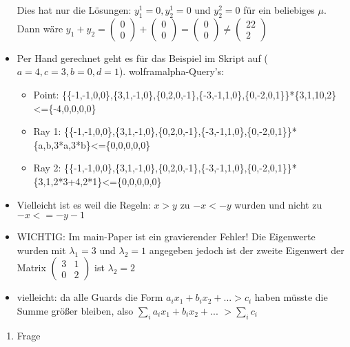 \begin{itemize}
		Dies hat nur die Lösungen: $y_1^1=0, y_2^1=0$ und $y_2^2=0$ für ein beliebiges $\mu$.\newline
		Dann wäre $y_1+y_2= \begin{pmatrix} 0 \\ 0 \end{pmatrix} + \begin{pmatrix} 0 \\ 0 \end{pmatrix}= \begin{pmatrix} 0 \\ 0 \end{pmatrix} \ne \begin{pmatrix} 22 \\ 2 \end{pmatrix}$
	\item
		Per Hand gerechnet geht es für das Beispiel im Skript auf ($a=4,c=3,b=0,d=1$).
		wolframalpha-Query's:
		\begin{itemize}
			\item Point: \{\{-1,-1,0,0\},\{3,1,-1,0\},\{0,2,0,-1\},\{-3,-1,1,0\},\{0,-2,0,1\}\}*\{3,1,10,2\}<=\{-4,0,0,0,0\}
			\item Ray 1: \{\{-1,-1,0,0\},\{3,1,-1,0\},\{0,2,0,-1\},\{-3,-1,1,0\},\{0,-2,0,1\}\}*\{a,b,3*a,3*b\}<=\{0,0,0,0,0\}
			\item Ray 2: \{\{-1,-1,0,0\},\{3,1,-1,0\},\{0,2,0,-1\},\{-3,-1,1,0\},\{0,-2,0,1\}\}*\{3,1,2*3+4,2*1\}<=\{0,0,0,0,0\}
		\end{itemize}
	\item Vielleicht ist es weil die Regeln: $x > y$ zu $-x < -y$ wurden und nicht zu $-x <= -y-1$
	\item WICHTIG: Im main-Paper ist ein gravierender Fehler! Die Eigenwerte wurden mit $\lambda_1 = 3 $ und  $\lambda_2 =1$ angegeben jedoch ist der zweite Eigenwert der Matrix $ \begin{pmatrix} 3 & 1 \\ 0 & 2 \end{pmatrix}$ ist $ \lambda_2 = 2$
	\item vielleicht: da alle Guards die Form $a_ix_1+b_ix_2+...>c_i$  haben müsste die Summe größer bleiben, also $\sum_{i} a_ix_1+b_ix_2+...$ $> \sum_{i} c_i$
\end{itemize}

\begin{enumerate}
	\item Frage
\end{enumerate}